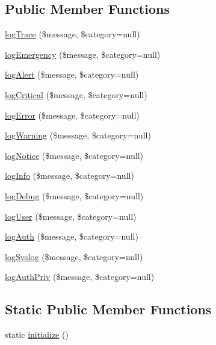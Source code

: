 \subsection*{Public Member Functions}
\begin{DoxyCompactItemize}
\item 
\hyperlink{classCXLLog_af69323cd61028fc50a9a83f87e474031}{logTrace} (\$message, \$category=null)
\item 
\hyperlink{classCXLLog_ad210b310780d22f0822826c7ab1b880e}{logEmergency} (\$message, \$category=null)
\item 
\hyperlink{classCXLLog_adffc6a79e12e0f1eb6e303985f6098b4}{logAlert} (\$message, \$category=null)
\item 
\hyperlink{classCXLLog_adbd22734b81e8f4240fba1f6a45eaf0a}{logCritical} (\$message, \$category=null)
\item 
\hyperlink{classCXLLog_a6f300bb6c899105c400a53d85f2e02a8}{logError} (\$message, \$category=null)
\item 
\hyperlink{classCXLLog_a4ca1d287757805ece6a3dc58feb89cdd}{logWarning} (\$message, \$category=null)
\item 
\hyperlink{classCXLLog_afb70d778267eb9c1a2ed51de373d9ebf}{logNotice} (\$message, \$category=null)
\item 
\hyperlink{classCXLLog_a0ca6d5e09b9c1300dcad8c23ba03339f}{logInfo} (\$message, \$category=null)
\item 
\hyperlink{classCXLLog_a5ecf86754e0cccf7e796375f947aa7e2}{logDebug} (\$message, \$category=null)
\item 
\hyperlink{classCXLLog_a7717f3825de0e907b3aad286565c66d5}{logUser} (\$message, \$category=null)
\item 
\hyperlink{classCXLLog_a16eecef77a5a2646770036b2a96ab915}{logAuth} (\$message, \$category=null)
\item 
\hyperlink{classCXLLog_aec359c02838e47991b36593a758cd36c}{logSyslog} (\$message, \$category=null)
\item 
\hyperlink{classCXLLog_aacbacc31e92697eb7e556766a5e03758}{logAuthPriv} (\$message, \$category=null)
\end{DoxyCompactItemize}
\subsection*{Static Public Member Functions}
\begin{DoxyCompactItemize}
\item 
static \hyperlink{classCXLLog_a32176804491a64a10ca2f6eb4dcb6a80}{initialize} ()
\end{DoxyCompactItemize}

